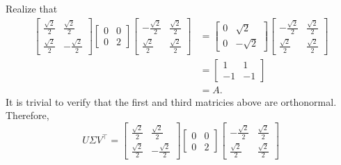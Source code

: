\documentclass[11pt]{article}
\begin{document}
Realize that
\begin{align*}
	\begin{bmatrix} \tfrac{\sqrt{2}}{2} & \tfrac{\sqrt{2}}{2} \\ \tfrac{\sqrt{2}}{2} & -\tfrac{\sqrt{2}}{2} \end{bmatrix} \begin{bmatrix} 0 & 0 \\ 0 & 2 \end{bmatrix} \begin{bmatrix} -\tfrac{\sqrt{2}}{2} & \tfrac{\sqrt{2}}{2} \\ \tfrac{\sqrt{2}}{2} & \tfrac{\sqrt{2}}{2} \end{bmatrix} &= \begin{bmatrix} 0 & \sqrt{2} \\ 0 & -\sqrt{2} \end{bmatrix} \begin{bmatrix} - \tfrac{\sqrt{2}}{2} & \tfrac{\sqrt{2}}{2} \\ \tfrac{\sqrt{2}}{2} & \tfrac{\sqrt{2}}{2} \end{bmatrix} \\
	&= \begin{bmatrix} 1 & 1 \\ -1 & -1 \end{bmatrix} \\
	&= A.
\end{align*}
It is trivial to verify that the first and third matricies above are orthonormal. Therefore,
\[
	\boxed{U \Sigma V^{\top} = \begin{bmatrix} \tfrac{\sqrt{2}}{2} & \tfrac{\sqrt{2}}{2} \\ \tfrac{\sqrt{2}}{2} & -\tfrac{\sqrt{2}}{2} \end{bmatrix} \begin{bmatrix} 0 & 0 \\ 0 & 2 \end{bmatrix} \begin{bmatrix} -\tfrac{\sqrt{2}}{2} & \tfrac{\sqrt{2}}{2} \\ \tfrac{\sqrt{2}}{2} & \tfrac{\sqrt{2}}{2} \end{bmatrix}}
\]
\end{document}
